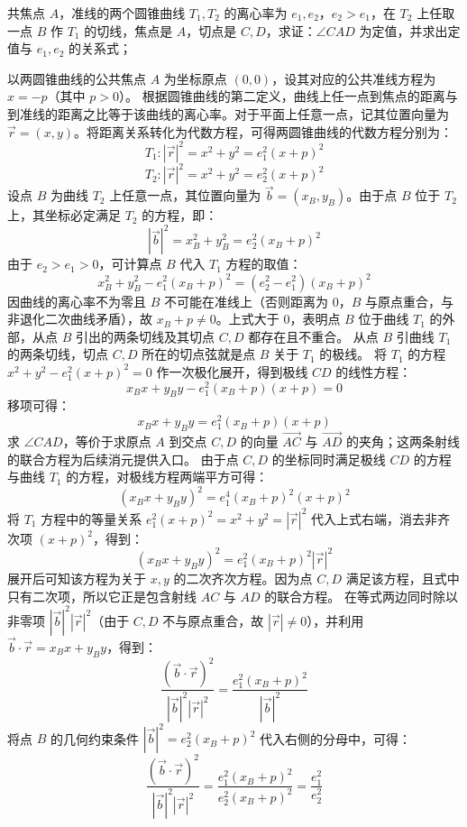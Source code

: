 \begin{exercise}
共焦点 \(A\)，准线的两个圆锥曲线 \(T_1,T_2\) 的离心率为 \(e_1,e_2\)，\(e_2 > e_1\)，在 \(T_2\) 上任取一点 \(B\) 作 \(T_1\) 的切线，焦点是 \(A\)，切点是 \(C,D\)，求证：\(\angle CAD\) 为定值，并求出定值与 \(e_1,e_2\) 的关系式；
\end{exercise}
\begin{solution}
以两圆锥曲线的公共焦点 $A$ 为坐标原点 $(0,0)$，设其对应的公共准线方程为 $x = -p$（其中 $p > 0$）。
根据圆锥曲线的第二定义，曲线上任一点到焦点的距离与到准线的距离之比等于该曲线的离心率。对于平面上任意一点，记其位置向量为 $\vec{r} = (x,y)$。将距离关系转化为代数方程，可得两圆锥曲线的代数方程分别为：
\[ T_1: |\vec{r}|^2 = x^2 + y^2 = e_1^2(x+p)^2 \]
\[ T_2: |\vec{r}|^2 = x^2 + y^2 = e_2^2(x+p)^2 \]
设点 $B$ 为曲线 $T_2$ 上任意一点，其位置向量为 $\vec{b} = (x_B, y_B)$。由于点 $B$ 位于 $T_2$ 上，其坐标必定满足 $T_2$ 的方程，即：
\[ |\vec{b}|^2 = x_B^2 + y_B^2 = e_2^2(x_B+p)^2 \]
由于 $e_2 > e_1 > 0$，可计算点 $B$ 代入 $T_1$ 方程的取值：
\[ x_B^2 + y_B^2 - e_1^2(x_B+p)^2 = (e_2^2 - e_1^2)(x_B+p)^2 \]
因曲线的离心率不为零且 $B$ 不可能在准线上（否则距离为 $0$，$B$ 与原点重合，与非退化二次曲线矛盾），故 $x_B+p \neq 0$。上式大于 $0$，表明点 $B$ 位于曲线 $T_1$ 的外部，从点 $B$ 引出的两条切线及其切点 $C,D$ 都存在且不重合。
从点 $B$ 引曲线 $T_1$ 的两条切线，切点 $C,D$ 所在的切点弦就是点 $B$ 关于 $T_1$ 的极线。
将 $T_1$ 的方程 $x^2 + y^2 - e_1^2(x+p)^2 = 0$ 作一次极化展开，得到极线 $CD$ 的线性方程：
\[ x_B x + y_B y - e_1^2(x_B+p)(x+p) = 0 \]
移项可得：
\[ x_B x + y_B y = e_1^2(x_B+p)(x+p) \]
求 $\angle CAD$，等价于求原点 $A$ 到交点 $C, D$ 的向量 $\overrightarrow{AC}$ 与 $\overrightarrow{AD}$ 的夹角；这两条射线的联合方程为后续消元提供入口。
由于点 $C, D$ 的坐标同时满足极线 $CD$ 的方程与曲线 $T_1$ 的方程，对极线方程两端平方可得：
\[ (x_B x + y_B y)^2 = e_1^4(x_B+p)^2(x+p)^2 \]
将 $T_1$ 方程中的等量关系 $e_1^2(x+p)^2 = x^2 + y^2 = |\vec{r}|^2$ 代入上式右端，消去非齐次项 $(x+p)^2$，得到：
\[ (x_B x + y_B y)^2 = e_1^2(x_B+p)^2 |\vec{r}|^2 \]
展开后可知该方程为关于 $x, y$ 的二次齐次方程。因为点 $C, D$ 满足该方程，且式中只有二次项，所以它正是包含射线 $AC$ 与 $AD$ 的联合方程。
在等式两边同时除以非零项 $|\vec{b}|^2 |\vec{r}|^2$（由于 $C, D$ 不与原点重合，故 $|\vec{r}| \neq 0$），并利用 $\vec{b} \cdot \vec{r} = x_B x + y_B y$，得到：
\[ \frac{(\vec{b} \cdot \vec{r})^2}{|\vec{b}|^2 |\vec{r}|^2} = \frac{e_1^2(x_B+p)^2}{|\vec{b}|^2} \]
将点 $B$ 的几何约束条件 $|\vec{b}|^2 = e_2^2(x_B+p)^2$ 代入右侧的分母中，可得：
\[ \frac{(\vec{b} \cdot \vec{r})^2}{|\vec{b}|^2 |\vec{r}|^2} = \frac{e_1^2(x_B+p)^2}{e_2^2(x_B+p)^2} = \frac{e_1^2}{e_2^2} \]

\end{solution}
